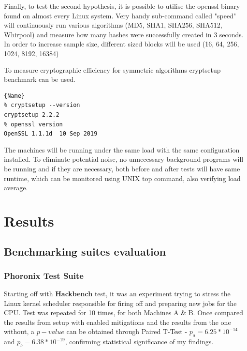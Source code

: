 \documentclass{csfourzero}
\begin{document}
Finally, to test the second hypothesis, it is possible to utilise the openssl binary found on almost every Linux system. Very handy sub-command called "speed" will continuously run various algorithms (MD5, SHA1, SHA256, SHA512, Whirpool) and measure how many hashes were successfully created in 3 seconds. In order to increase sample size, different sized blocks will be used (16, 64, 256, 1024, 8192, 16384)

To measure cryptographic efficiency for symmetric algorithms cryptsetup benchmark can be used. 

\begin{lstlisting}[caption=Versions of crypsetup and openssl, frame=tlrb, basicstyle=\small]{Name}
% cryptsetup --version
cryptsetup 2.2.2
% openssl version     
OpenSSL 1.1.1d  10 Sep 2019
\end{lstlisting}

The machines will be running under the same load with the same configuration installed. To eliminate potential noise, no unnecessary background programs will be running and if they are necessary, both before and after tests will have same runtime, which can be monitored using UNIX top command, also verifying load average. 

\section{Results}
\label{sec:results}

\subsection{Benchmarking suites evaluation}

\subsubsection{Phoronix Test Suite}

Starting off with \textbf{Hackbench} test, it was an experiment trying to stress the Linux kernel scheduler responsible for firing off and preparing new jobs for the CPU. Test was repeated for 10 times, for both Machines A \& B. Once compared the results from setup with enabled mitigations and the results from the one without, a $p-value$ can be obtained through Paired T-Test - $p_{a} = 6.25 * 10^{-14}$ and $p_{b} = 6.38 * 10^{-19}$, confirming statistical significance of my findings. 
\end{document}
